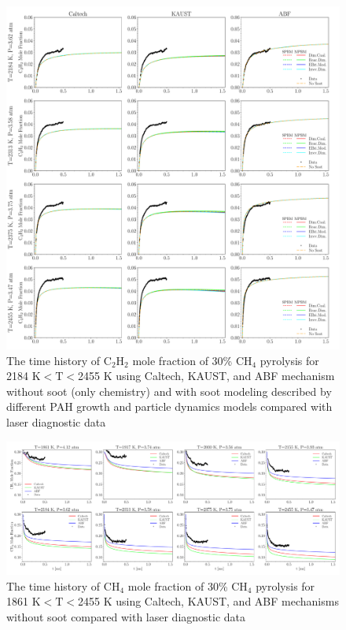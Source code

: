 \begin{figure}[H]
	\centering
	\includegraphics[width=1\textwidth]{Figures/Results/Shocktube/Stanford/june/30CH4_C2H2_mechs_s1.pdf}
	\caption{The time history of $\mathrm{C_2H_2}$ mole fraction of 30\% $\mathrm{CH_4}$ pyrolysis for 2184 K$<\mathrm{T}<$2455 K using Caltech, KAUST, and ABF mechanism without soot (only chemistry) and with soot modeling described by different PAH growth and particle dynamics models compared with laser diagnostic data}
	\label{fig:shocktubest_30ch4_c2h2_1} 
\end{figure}


\begin{figure}[H]
	\centering
	\includegraphics[width=1\textwidth]{Figures/Results/Shocktube/Stanford/june/30CH4_CH4_mechs_nosoot.pdf}
	\caption{The time history of $\mathrm{CH_4}$ mole fraction of 30\% $\mathrm{CH_4}$ pyrolysis for 1861 K$<\mathrm{T}<$2455 K using Caltech, KAUST, and ABF mechanisms without soot compared with laser diagnostic data}
	\label{fig:shocktubest_30ch4_nosoot_ch4} 
\end{figure}

